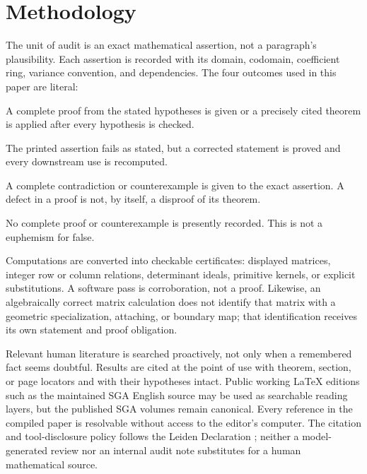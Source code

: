 \section{Methodology}

The unit of audit is an exact mathematical assertion, not a paragraph's
plausibility.  Each assertion is recorded with its domain, codomain,
coefficient ring, variance convention, and dependencies.  The four outcomes
used in this paper are literal:

\begin{description}[leftmargin=7.4em,style=nextline]
\item[Validated] A complete proof from the stated hypotheses is given or a
precisely cited theorem is applied after every hypothesis is checked.
\item[Repaired] The printed assertion fails as stated, but a corrected
statement is proved and every downstream use is recomputed.
\item[Disproved] A complete contradiction or counterexample is given to the
exact assertion.  A defect in a proof is not, by itself, a disproof of its
theorem.
\item[Open] No complete proof or counterexample is presently recorded.  This
is not a euphemism for false.
\end{description}

Computations are converted into checkable certificates: displayed matrices,
integer row or column relations, determinant ideals, primitive kernels, or
explicit substitutions.  A software pass is corroboration, not a proof.
Likewise, an algebraically correct matrix calculation does not identify that
matrix with a geometric specialization, attaching, or boundary map; that
identification receives its own statement and proof obligation.

Relevant human literature is searched proactively, not only when a remembered
fact seems doubtful.  Results are cited at the point of use with theorem,
section, or page locators and with their hypotheses intact.  Public working
\LaTeX{} editions such as the maintained SGA English source
\cite{SGAEnglish2026} may be used as searchable reading layers, but the
published SGA volumes \cite{SGA7I1972,SGA7II1973} remain canonical.  Every
reference in the compiled paper is resolvable without access to the editor's
computer.  The citation and tool-disclosure policy follows the Leiden
Declaration \cite{Leiden2026}; neither a model-generated review nor an
internal audit note substitutes for a human mathematical source.

